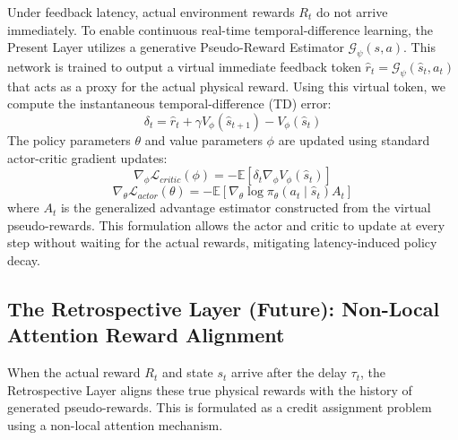 \documentclass[manuscript, screen, review]{jair}
\begin{document}
Under feedback latency, actual environment rewards $R_t$ do not arrive immediately. To enable continuous real-time temporal-difference learning, the Present Layer utilizes a generative Pseudo-Reward Estimator $\mathcal{G}_\psi(s, a)$. This network is trained to output a virtual immediate feedback token $\hat{r}_t = \mathcal{G}_\psi(\hat{s}_t, a_t)$ that acts as a proxy for the actual physical reward. Using this virtual token, we compute the instantaneous temporal-difference (TD) error:
\begin{equation}
    \delta_t = \hat{r}_t + \gamma V_\phi(\hat{s}_{t+1}) - V_\phi(\hat{s}_t)
\end{equation}
The policy parameters $\theta$ and value parameters $\phi$ are updated using standard actor-critic gradient updates:
\begin{equation}
    \nabla_\phi \mathcal{L}_{critic}(\phi) = -\mathbb{E} \left[ \delta_t \nabla_\phi V_\phi(\hat{s}_t) \right]
\end{equation}
\begin{equation}
    \nabla_\theta \mathcal{L}_{actor}(\theta) = -\mathbb{E} \left[ \nabla_\theta \log \pi_\theta(a_t \mid \hat{s}_t) A_t \right]
\end{equation}
where $A_t$ is the generalized advantage estimator constructed from the virtual pseudo-rewards. This formulation allows the actor and critic to update at every step without waiting for the actual rewards, mitigating latency-induced policy decay.

\subsection{The Retrospective Layer (Future): Non-Local Attention Reward Alignment}
When the actual reward $R_t$ and state $s_t$ arrive after the delay $\tau_t$, the Retrospective Layer aligns these true physical rewards with the history of generated pseudo-rewards. This is formulated as a credit assignment problem using a non-local attention mechanism.
\end{document}
